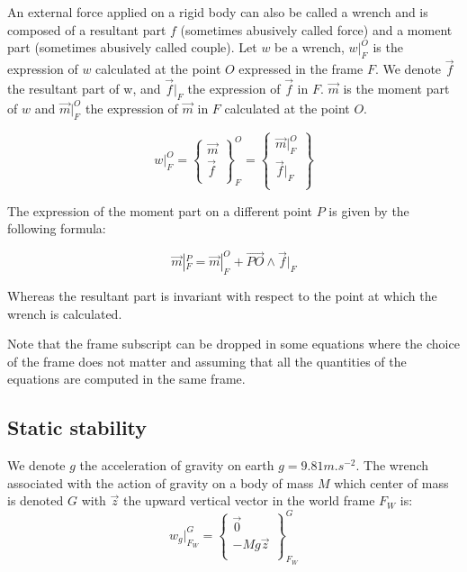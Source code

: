 An external force applied on a rigid body can also be called a wrench and is composed of a resultant part $f$ (sometimes abusively called force) and a moment part (sometimes abusively called couple).
Let $w$ be a wrench, $w|_F^O$ is the expression of $w$ calculated at the point $O$ expressed in the frame $F$.
We denote $\vec{f}$ the resultant part of w, and $\vec{f}|_F$ the expression of $\vec{f}$ in $F$.
$\vec{m}$ is the moment part of $w$ and $\vec{m}|_F^O$ the expression of $\vec{m}$ in $F$ calculated at the point $O$.

\begin{equation}
  w|_F^O = \left\{ \begin{array}{r}
    \vec{m}\\
    \vec{f}\\
  \end{array} \right\}^O_F
  = \left\{ \begin{array}{r}
    \vec{m}|_F^O\\
    \vec{f}|_F\\
  \end{array}\right\}
\end{equation}

The expression of the moment part on a different point $P$ is given by the following formula:

\begin{equation}
  \vec{m}|_F^P = \vec{m}|_F^O + \overrightarrow{PO} \wedge \vec{f}|_F
\end{equation}

Whereas the resultant part is invariant with respect to the point at which the wrench is calculated.

Note that the frame subscript can be dropped in some equations where the choice of the frame does not matter and assuming that all the quantities of the equations are computed in the same frame.



\subsection{Static stability}
\label{sub:static_stability}


We denote $g$ the acceleration of gravity on earth $g = 9.81 m.s^{-2}$.
The wrench associated with the action of gravity on a body of mass $M$ which center of mass is denoted $G$ with $\vec{z}$ the upward vertical vector in the world frame $F_W$ is:
\begin{equation}
  w_g|^G_{F_W} = \left\{ \begin{array}{r}
     \vec{0} \\
     -Mg\vec{z} \\
 \end{array}\right\}^G_{F_W}
\end{equation}

